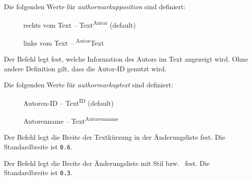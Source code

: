 Die folgenden Werte für \emph{authormarkupposition} sind definiert:

\begin{description}
	\item [] rechts vom Text -- Text\textsuperscript{Autor} (default)
	\item [] links vom Text -- \textsuperscript{Autor}Text
\end{description}





Der Befehl  legt fest, welche Information des Autors im Text angezeigt wird.
Ohne andere Definition gilt, dass die Autor-ID genutzt wird.

Die folgenden Werte für \emph{authormarkuptext} sind definiert:

\begin{description}
	\item [] Autoren-ID -- Text\textsuperscript{ID} (default)
	\item [] Autorenname -- Text\textsuperscript{Autorenname}
\end{description}






Der Befehl  legt die Breite der Textkürzung in der Änderungsliste fest.
Die Standardbreite ist \texttt{0.6}.






Der Befehl  legt die Breite der Änderungsliste mit Stil  bzw.\  fest.
Die Standardbreite ist \texttt{0.3}.






